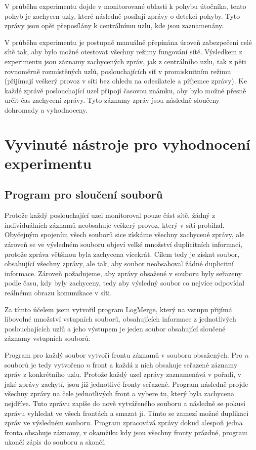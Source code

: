 \documentclass[11pt,final,twoside]{fithesis2}
\begin{document}
V průběhu experimentu dojde v monitorované oblasti k pohybu útočníka, tento pohyb je zachycen uzly, které následně posílají zprávy
o detekci pohyby. Tyto zprávy jsou opět přeposílány k centrálnímu uzlu, kde jsou zaznamenány.  

V průběhu experimentu je postupně manuálně přepínána úroveň zabezpečení celé sítě tak, aby bylo možné otestovat všechny režimy fungování 
sítě. Výsledkem z experimentu jsou záznamy zachycených zpráv, jak z centrálního uzlu, tak z pěti rovnoměrně rozmístěných uzlů, poslouchajících 
síť v promiskuitním režimu (přijímají veškerý provoz v síti bez ohledu na odesílatele a příjemce zprávy). Ke každé zprávě poslouchající 
uzel připojí časovou známku, aby bylo možné přesně určit čas zachycení zprávy.  Tyto záznamy zpráv jsou následně sloučeny dohromady a 
vyhodnoceny.


\section{Vyvinuté nástroje pro vyhodnocení experimentu}
\subsection{Program pro sloučení souborů}
Protože každý poslouchající uzel monitoroval pouze část sítě, žádný z individuálních záznamů neobsahuje veškerý provoz, který v síti 
probíhal. Obyčejným spojením všech souborů sice získáme všechny zachycené zprávy, ale zároveň se ve výsledném souboru objeví velké 
množství duplicitních informací, protože zpráva většinou byla zachycena vícekrát. Cílem tedy je získat soubor, obsahující všechny zprávy, 
ale tak, aby soubor neobsahoval žádné duplicitní informace. Zároveň požadujeme, aby zprávy obsažené v souboru byly seřazeny podle času, 
kdy byly zachyceny, tedy aby výsledný soubor co nejvíce odpovídal reálnému obrazu komunikace v síti. 

Za tímto účelem jsem vytvořil program LogMerge, který na vstupu přijímá libovolné množství vstupních souborů, obsahujících informace z 
jednotlivých poslouchajících uzlů a jeho výstupem je jeden soubor obsahující sloučené záznamy vstupních souborů. 

Program pro každý soubor vytvoří frontu záznamů v souboru obsažených. Pro $n$ souborů je tedy vytvořeno $n$ front a každá z nich obsahuje 
seřazené záznamy zpráv z konkrétního uzlu. Protože každý uzel zprávy zaznamenává v pořadí, v jaké zprávy zachytí, jsou již jednotlivé 
fronty seřazené. Program následně projde všechny zprávy na čele jednotlivých front a vybere tu, který byla zachycena nejdříve. Tuto 
zprávu zapíše do nově vytvářeného souboru a následně se pokusí zprávu vyhledat ve všech frontách a smazat ji. Tímto se zamezí možné 
duplikaci zpráv ve výsledném souboru. Program zpracovává zprávy dokud alespoň jedna fronta obsahuje záznamy, v okamžiku kdy jsou všechny 
fronty prázdné, program ukončí zápis do souboru a skončí. 
\end{document}
